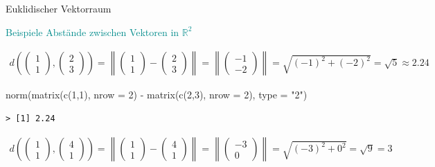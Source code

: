 \documentclass[
  8pt,
  ignorenonframetext,
]{beamer}
\newenvironment{Shaded}{\begin{snugshade}}{\end{snugshade}}
\newcommand{\AttributeTok}[1]{\textcolor[rgb]{0.77,0.63,0.00}{#1}}
\newcommand{\DecValTok}[1]{\textcolor[rgb]{0.00,0.00,0.81}{#1}}
\newcommand{\FunctionTok}[1]{\textcolor[rgb]{0.00,0.00,0.00}{#1}}
\newcommand{\NormalTok}[1]{#1}
\newcommand{\SpecialCharTok}[1]{\textcolor[rgb]{0.00,0.00,0.00}{#1}}
\newcommand{\StringTok}[1]{\textcolor[rgb]{0.31,0.60,0.02}{#1}}
\begin{document}
\begin{frame}[fragile]{Euklidischer Vektorraum}
\protect\hypertarget{euklidischer-vektorraum-7}{}
\vspace{3mm}

\textcolor{darkcyan}{Beispiele Abstände zwischen Vektoren in $\mathbb{R}^2$}
\footnotesize {}

\begin{align*}
d\left(\begin{pmatrix}1\\1\end{pmatrix}, \begin{pmatrix}2\\3\end{pmatrix}\right) = \left\lVert \begin{pmatrix}1\\1\end{pmatrix} - \begin{pmatrix}2\\3\end{pmatrix}\right\rVert = \left\lVert \begin{pmatrix}-1\\-2\end{pmatrix}\right\rVert = \sqrt{(-1)^2+(-2)^2} = \sqrt{5} \approx 2.24
\end{align*}

\begin{Shaded}
\begin{Highlighting}[]
\FunctionTok{norm}\NormalTok{(}\FunctionTok{matrix}\NormalTok{(}\FunctionTok{c}\NormalTok{(}\DecValTok{1}\NormalTok{,}\DecValTok{1}\NormalTok{), }\AttributeTok{nrow =} \DecValTok{2}\NormalTok{) }\SpecialCharTok{{-}} \FunctionTok{matrix}\NormalTok{(}\FunctionTok{c}\NormalTok{(}\DecValTok{2}\NormalTok{,}\DecValTok{3}\NormalTok{), }\AttributeTok{nrow =} \DecValTok{2}\NormalTok{), }\AttributeTok{type =} \StringTok{"2"}\NormalTok{)}
\end{Highlighting}
\end{Shaded}

\begin{verbatim}
> [1] 2.24
\end{verbatim}

\begin{align*}
d\left(\begin{pmatrix}1\\1\end{pmatrix}, \begin{pmatrix}4\\1\end{pmatrix}\right) = \left\lVert \begin{pmatrix}1\\1\end{pmatrix} - \begin{pmatrix}4\\1\end{pmatrix}\right\rVert = \left\lVert \begin{pmatrix}-3\\0\end{pmatrix}\right\rVert = \sqrt{(-3)^2+0^2} = \sqrt{9} = 3
\end{align*}


\end{frame}
\end{document}
